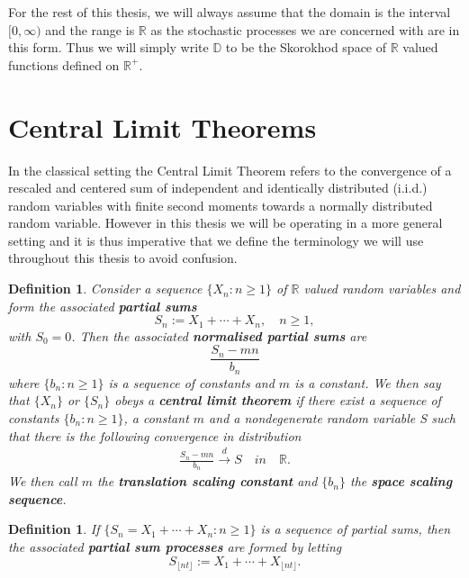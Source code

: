 \documentclass[honours,12pt]{unswthesis}
\newcommand{\R}{\mathbb{R}}
\newcommand{\Rp}{\mathbb R^+}
\newcommand{\1}{\mathbf 1}
\newcommand{\Floor}[1]{{\lfloor {#1} \rfloor}}
\newcommand{\cd}{\overset{d}{\longrightarrow}}
\newcommand{\D}{\mathbb{D}}
\newtheorem{definition}[equation]{Definition}
\numberwithin{equation}{section}
\theoremstyle{definition}
\theoremstyle{remark}
\begin{document}
For the rest of this thesis, we will always assume that the domain is the interval
$[0,\infty)$ and the range is $\R$ as the stochastic processes we are concerned with are in this form. Thus we will simply write $\D$ to be the Skorokhod space of $\R$ valued functions defined on $\Rp$.

\section{Central Limit Theorems}
In the classical setting the Central Limit Theorem refers to the convergence of a rescaled and centered sum of independent and identically distributed (i.i.d.) random variables with finite second moments towards a normally distributed random variable. However in this thesis we will be operating in a more general setting and it is thus imperative that we define the terminology we will use throughout this thesis to avoid confusion.\\

\begin{definition}
	Consider a sequence $\{X_n:n\geq1\}$ of $\R$ valued random variables and form the associated \textbf{partial sums}
	\[
		S_n:=X_1+\cdots+X_n,\quad n\geq1,
	\]
with $S_0=0$. Then the associated \textbf{normalised partial sums} are
\[
	\frac{S_n-mn}{b_n}
\]
where $\{b_n:n\geq 1\}$ is a sequence of constants and $m$ is a constant. We then say that $\{X_n\}$ or $\{S_n\}$ obeys a \textbf{central limit theorem} if there exist a sequence of constants $\{b_n:n\geq 1\}$, a constant $m$ and a nondegenerate random variable S such that there is the following convergence in distribution
\begin{align}\label{eq:partialSum}
	\frac{S_n-mn}{b_n}\cd S \quad in\quad \R.
\end{align}
We then call $m$ the \textbf{translation scaling constant} and $\{b_n\}$ the \textbf{space scaling sequence}.\\
\end{definition}



\begin{definition}
	If $\{S_n=X_1+\cdots+X_n:n\geq1\}$ is a sequence of partial sums, then the associated \textbf{partial sum processes} are formed by letting
	\[
		S_\Floor{nt}:=X_1+\cdots+X_\Floor{nt}.
	\]
\end{definition}
\end{document}

